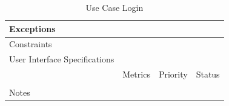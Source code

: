 \begin{table}[H]
\begin{tabularx}{\linewidth}{|l|X|X|X|}
            \hline Exceptions                    & \multicolumn{3}{l|}{}                                                                                 \\

            \hline Constraints                   & \multicolumn{3}{l|}{}                                                                                 \\

            \hline User Interface Specifications & \multicolumn{3}{l|}{}                                                                                 \\

            \hline \multirow{2}{*}{}             & Metrics                                                                           & Priority & Status \\
            \cline{2-4}                          &                                                                                   &          &        \\
            \hline Notes                         & \multicolumn{3}{l|}{}                                                                                 \\
            \hline
      \end{tabularx}
      \caption{Use Case Login}
      \label{tab:use_case_login}
\end{table}

